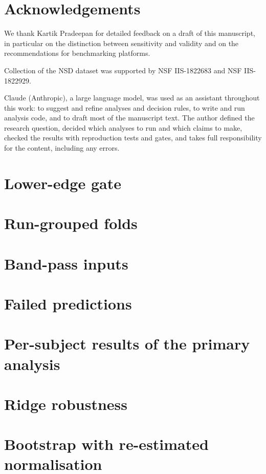\documentclass[10pt]{article}
\begin{document}
\section*{Acknowledgements}
We thank Kartik Pradeepan for detailed feedback on a draft of this manuscript, in particular on the distinction between sensitivity and validity and on the recommendations for benchmarking platforms.

Collection of the NSD dataset was supported by NSF IIS-1822683 and NSF IIS-1822929.

Claude (Anthropic), a large language model, was used as an assistant throughout this work: to suggest and refine analyses and decision rules, to write and run analysis code, and to draft most of the manuscript text. The author defined the research question, decided which analyses to run and which claims to make, checked the results with reproduction tests and gates, and takes full responsibility for the content, including any errors.




\appendix
\section{Lower-edge gate}
\label{app:lowedge}

\section{Run-grouped folds}
\label{app:runfolds}

\section{Band-pass inputs}
\label{app:bandpass}

\section{Failed predictions}
\label{app:failed}

\section{Per-subject results of the primary analysis}
\label{app:persubject}

\section{Ridge robustness}
\label{app:ridgerobust}

\section{Bootstrap with re-estimated normalisation}
\label{app:bootnorm}

\end{document}
